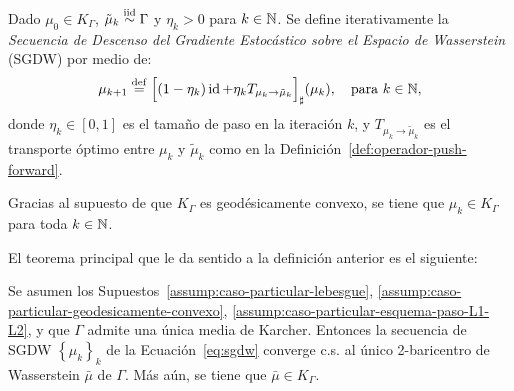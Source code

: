 \begin{definition}\label{def:sgdw}
    Dado $\mu_0 \in K_\Gamma$, $\tilde \mu_k \stackrel{\mathrm{iid}}{\sim} \Gamma$ y $\eta_k > 0$ para $k \in\mathbb{N}$. Se define iterativamente la \textit{Secuencia de Descenso del Gradiente Estocástico sobre el Espacio de Wasserstein} (SGDW) por medio de:
    \begin{equation}
        \label{eq:sgdw}
        \mu_{k+1} \stackrel{\mathrm{def}}{=} {\qty\Big[
                (1 - \eta_k) \operatorname{id} + \eta_k T_{\mu_k \to \tilde \mu_k}
            ]}_{\sharp} (\mu_k), \quad \text{para } k \in\mathbb{N},
    \end{equation}
    donde $\eta_k \in [0, 1]$ es el tamaño de paso en la iteración $k$, y $T_{\mu_k \to \tilde \mu_k}$ es el transporte óptimo entre $\mu_k$ y $\tilde \mu_k$ como en la Definición~\ref{def:operador-push-forward}.
\end{definition}




\begin{remark}
    Gracias al supuesto de que $K_\Gamma$ es geodésicamente convexo, se tiene que $\mu_k \in K_\Gamma$ para toda $k \in\mathbb{N}$.
\end{remark}

El teorema principal que le da sentido a la definición anterior es el siguiente:

\begin{theorem}\label{thm:convergencia-sgdw}
    Se asumen los Supuestos~\ref{assump:caso-particular-lebesgue}, \ref{assump:caso-particular-geodesicamente-convexo}, \ref{assump:caso-particular-esquema-paso-L1-L2}, y que $\Gamma$ admite una única media de Karcher. Entonces la secuencia de SGDW $\left\{ \mu_k \right\}_k$ de la Ecuación~\eqref{eq:sgdw} converge c.s. al único 2-baricentro de Wasserstein $\bar \mu$ de $\Gamma$. Más aún, se tiene que $\bar \mu\in K_\Gamma$.
\end{theorem}

